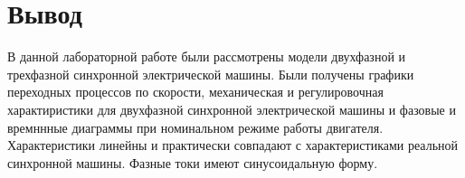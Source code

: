 \section{Вывод}
В данной лабораторной работе были рассмотрены модели двухфазной и трехфазной синхронной электрической машины. Были получены графики переходных процессов по скорости, механическая и регулировочная характиристики для двухфазной синхронной электрической машины и фазовые и времннные диаграммы при номинальном режиме работы двигателя. Характеристики линейны и практически совпадают с характеристиками реальной синхронной машины. Фазные токи имеют синусоидальную форму.

